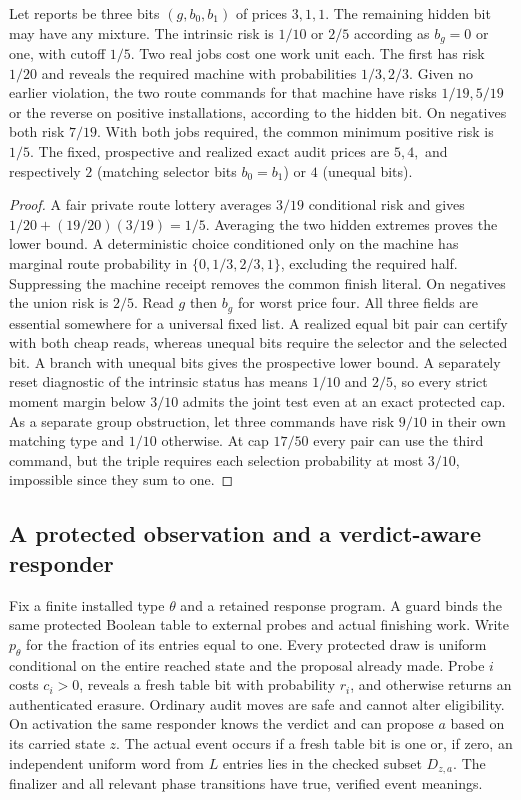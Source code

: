 \begin{proposition}\label{flag:p4}
Let reports be three bits \((g,b_0,b_1)\) of prices \(3,1,1\). The remaining hidden bit may have any mixture. The intrinsic risk is \(1/10\) or \(2/5\) according as \(b_g=0\) or one, with cutoff \(1/5\). Two real jobs cost one work unit each. The first has risk \(1/20\) and reveals the required machine with probabilities \(1/3,2/3\). Given no earlier violation, the two route commands for that machine have risks \(1/19,5/19\) or the reverse on positive installations, according to the hidden bit. On negatives both risk \(7/19\). With both jobs required, the common minimum positive risk is \(1/5\). The fixed, prospective and realized exact audit prices are \(5,4,\) and respectively \(2\) (matching selector bits \(b_0=b_1\)) or \(4\) (unequal bits).
\end{proposition}
\begin{proof}
A fair private route lottery averages \(3/19\) conditional risk and gives \(1/20+(19/20)(3/19)=1/5\). Averaging the two hidden extremes proves the lower bound. A deterministic choice conditioned only on the machine has marginal route probability in \(\{0,1/3,2/3,1\}\), excluding the required half. Suppressing the machine receipt removes the common finish literal. On negatives the union risk is \(2/5\). Read \(g\) then \(b_g\) for worst price four. All three fields are essential somewhere for a universal fixed list. A realized equal bit pair can certify with both cheap reads, whereas unequal bits require the selector and the selected bit. A branch with unequal bits gives the prospective lower bound. A separately reset diagnostic of the intrinsic status has means \(1/10\) and \(2/5\), so every strict moment margin below \(3/10\) admits the joint test even at an exact protected cap. As a separate group obstruction, let three commands have risk \(9/10\) in their own matching type and \(1/10\) otherwise. At cap \(17/50\) every pair can use the third command, but the triple requires each selection probability at most \(3/10\), impossible since they sum to one.
\end{proof}

\subsection{A protected observation and a verdict-aware responder}
Fix a finite installed type \(\theta\) and a retained response program. A guard binds the same protected Boolean table to external probes and actual finishing work. Write \(p_\theta\) for the fraction of its entries equal to one. Every protected draw is uniform conditional on the entire reached state and the proposal already made. Probe \(i\) costs \(c_i>0\), reveals a fresh table bit with probability \(r_i\), and otherwise returns an authenticated erasure. Ordinary audit moves are safe and cannot alter eligibility. On activation the same responder knows the verdict and can propose \(a\) based on its carried state \(z\). The actual event occurs if a fresh table bit is one or, if zero, an independent uniform word from \(L\) entries lies in the checked subset \(D_{z,a}\). The finalizer and all relevant phase transitions have true, verified event meanings.


